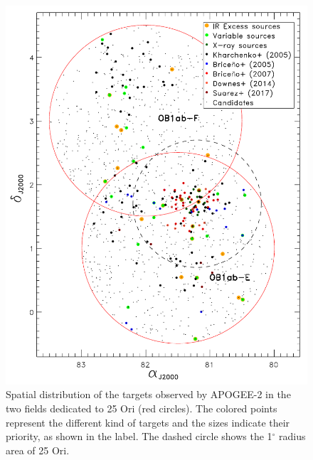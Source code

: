 \documentclass[12pt]{article}
\begin{document}
\begin{figure}%
	\centering
	\includegraphics[width=1.\textwidth]{sky_APOGEE-2.pdf}
	\caption[Spatial distribution of the targets observed by APOGEE-2 in 25 Ori]{Spatial distribution of the targets observed by APOGEE-2 in the two fields dedicated to 25 Ori (red circles). The colored points represent the different kind of targets and the sizes indicate their priority, as shown in the label. The dashed circle shows the 1$^\circ$ radius area of 25 Ori.}
	\label{fig_APOGEE-2:sky}
\end{figure}
\end{document}
